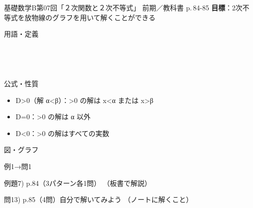 \documentclass[aspectratio=43,professionalfonts,handout]{beamer}
\newcommand{\LectureNum}{07}
\newcommand{\LectureTitle}{２次関数と２次不等式}
\newcommand{\TextPages}{p.\,84-85}
\newcommand{\CourseName}{基礎数学B}
\renewcommand{\TermName}{前期}
\begin{document}
\begin{frame}{\CourseName\quad 第\LectureNum 回「\LectureTitle 」}
  {\small \TermName\quad \TeacherName\quad ／\quad 教科書 \TextPages\quad
  \textbf{目標}：2次不等式を放物線のグラフを用いて解くことができる}

  \begin{block}{用語・定義}
  \begin{description}[labelwidth=5.5em]
    \item[\kw{2次不等式}] ~
    \item[\kw{解き方（グラフを利用）}] ~
  \end{description}
  \end{block}
\end{frame}

\begin{frame}{公式・性質}
  \begin{block}{}
  \begin{itemize}
    \item D>0（解 α<β）：>0 の解は x<α または x>β
    \item D=0：>0 の解は α 以外
    \item D<0：>0 の解はすべての実数
  \end{itemize}
  \end{block}
\end{frame}

\begin{frame}{図・グラフ}
  \centering
\end{frame}

\begin{frame}{例1→問1}
  \begin{exampleblock}{例題7) p.84（3パターン各1問）}
    （板書で解説）
  \end{exampleblock}

  \vfill

  \begin{block}{問13) p.85（4問）\quad 自分で解いてみよう}
    （ノートに解くこと）
  \end{block}
\end{frame}
\end{document}
